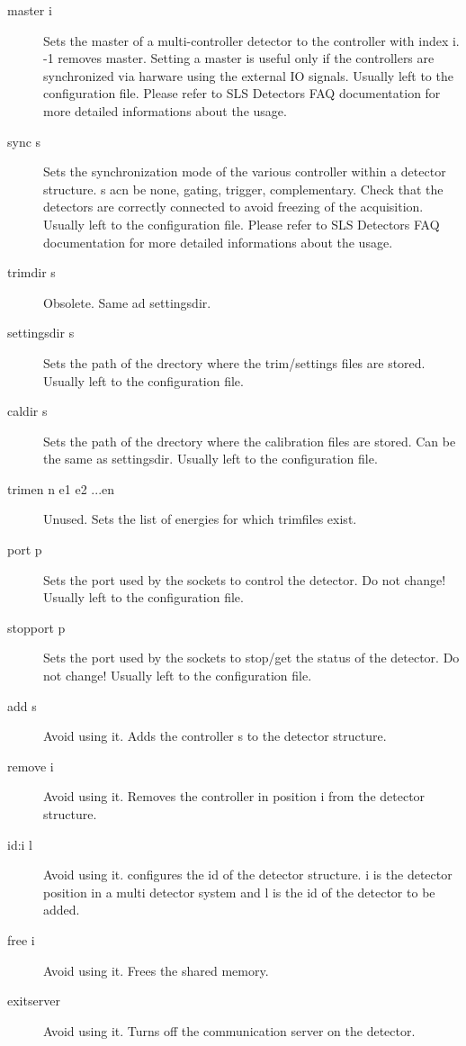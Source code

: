 \documentclass{article}
\begin{document}
\begin{description}
\item[master i] Sets the master of a multi-controller detector to the controller with index i. -1 removes master. Setting a master is useful only if the controllers are synchronized via harware using the external IO signals. Usually left to the configuration file. Please refer to SLS Detectors FAQ documentation for more detailed informations about the usage.  
\item[sync s] Sets the synchronization mode of the various controller within a detector structure. s acn be none, gating, trigger, complementary. Check that the detectors are correctly connected to avoid freezing of the acquisition. Usually left to the configuration file. Please refer to SLS Detectors FAQ documentation for more detailed informations about the usage.
\item[trimdir s] Obsolete. Same ad settingsdir.
\item[settingsdir s] Sets the path of the drectory where the trim/settings files are stored. Usually left to the configuration file.
\item[caldir s]    Sets the path of the drectory where the calibration files are stored. Can be the same as settingsdir. Usually left to the configuration file. 
\item[trimen n e1 e2 ...en] Unused. Sets the list of energies for which trimfiles exist.
\item[port p] Sets the port used by the sockets to control the detector. Do not change! Usually left to the configuration file.
\item[stopport p] Sets the port used by the sockets to stop/get the status of the detector. Do not change! Usually left to the configuration file.
\item[add s] Avoid using it. Adds the controller s to the detector structure.  
\item[remove i] Avoid using it. Removes the controller in position i from the detector structure.  
\item[id:i l]  Avoid using it. configures the id of the detector structure. i is the detector position in a multi detector system and l is the id of the detector to be added. 
\item[free i]  Avoid using it. Frees the shared memory. 
\item[exitserver]   Avoid using it. Turns off the communication server on the detector.
\end{description}
\end{document}
